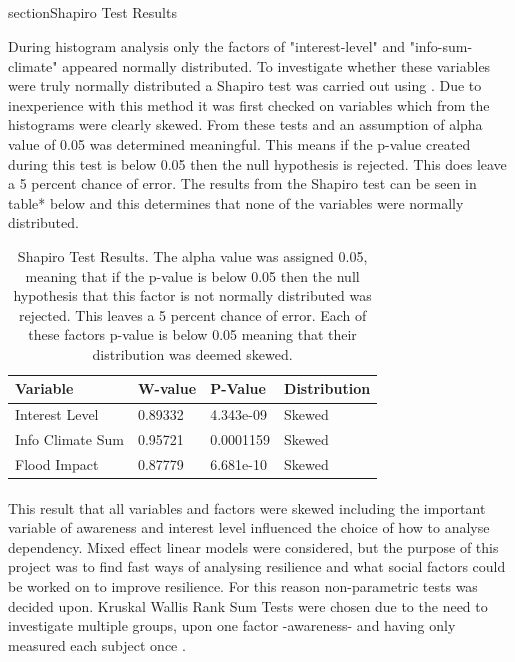 \subsection{}section{Shapiro Test Results}

During histogram analysis only the factors of "interest-level" and "info-sum-climate" appeared normally distributed. To investigate whether these variables were truly normally distributed a Shapiro test was carried out using \cite{royston_extension_1982} . Due to inexperience with this method it was first checked on variables which from the histograms were clearly skewed. From these tests and \cite{royston_extension_1982} an assumption of alpha value of 0.05 was determined meaningful. This means if the p-value created during this test is below 0.05 then the null hypothesis is rejected. This does leave a 5 percent chance of error. The results from the Shapiro test can be seen in table* below and this determines that none of the variables were normally distributed. 

\begin{table}[h]
    \centering
    \begin{tabular}{|l|l|l|l|}
    \hline
         Variable & W-value & P-Value & Distribution \\ \hline
       Interest Level & 0.89332 & 4.343e-09 & Skewed \\ \hline
         Info Climate Sum  & 0.95721 & 0.0001159 & Skewed \\ \hline
        Flood Impact & 0.87779 & 6.681e-10 & Skewed \\ \hline
     \end{tabular}
    \caption{Shapiro Test Results. The alpha value was assigned 0.05, meaning that if the p-value is below 0.05 then the null hypothesis that this factor is not normally distributed was rejected. This leaves a 5 percent chance of error. Each of these factors p-value is below 0.05 meaning that their distribution was deemed skewed.}
    \label{table:shapiro_test_results}
\end{table}
\paragraph{}

This result that all variables and factors were skewed including the important variable of awareness and interest level influenced the choice of how to analyse dependency. Mixed effect linear models were considered, but the purpose of this project was to find fast ways of analysing resilience and what social factors could be worked on to improve resilience. For this reason non-parametric tests was decided upon. Kruskal Wallis Rank Sum Tests were chosen due to the need to investigate multiple groups, upon one factor -awareness- and having only measured each subject once \cite{hollander_nonparametric_2014}. 

